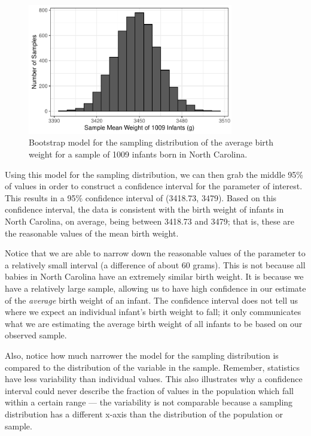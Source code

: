 \documentclass[
  letterpaper,
  DIV=11,
  numbers=noendperiod]{scrreprt}
\theoremstyle{plain}
\theoremstyle{definition}
\theoremstyle{definition}
\theoremstyle{remark}
\begin{document}
\begin{figure}

{\centering \includegraphics[width=0.8\textwidth,height=\textheight]{./images/fig-confint-samp-distn-1.pdf}

}

\caption{\label{fig-confint-samp-distn}Bootstrap model for the sampling
distribution of the average birth weight for a sample of 1009 infants
born in North Carolina.}

\end{figure}

Using this model for the sampling distribution, we can then grab the
middle 95\% of values in order to construct a confidence interval for
the parameter of interest. This results in a 95\% confidence interval of
(3418.73, 3479). Based on this confidence interval, the data is
consistent with the birth weight of infants in North Carolina, on
average, being between 3418.73 and 3479; that is, these are the
reasonable values of the mean birth weight.

Notice that we are able to narrow down the reasonable values of the
parameter to a relatively small interval (a difference of about 60
grams). This is not because all babies in North Carolina have an
extremely similar birth weight. It is because we have a relatively large
sample, allowing us to have high confidence in our estimate of the
\emph{average} birth weight of an infant. The confidence interval does
not tell us where we expect an individual infant's birth weight to fall;
it only communicates what we are estimating the average birth weight of
all infants to be based on our observed sample.

Also, notice how much narrower the model for the sampling distribution
is compared to the distribution of the variable in the sample. Remember,
statistics have less variability than individual values. This also
illustrates why a confidence interval could never describe the fraction
of values in the population which fall within a certain range --- the
variability is not comparable because a sampling distribution has a
different x-axis than the distribution of the population or sample.
\end{document}
